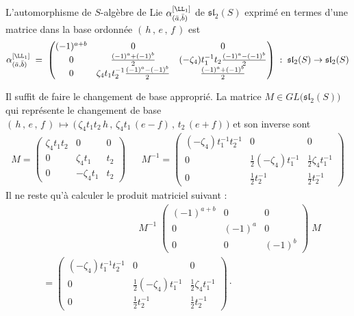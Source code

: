 \begin{annexeCor} L'automorphisme de $S$-algèbre de Lie $\alpha_{(\bar{a},\bar{b})}^{[\LL_1]}$ de $\mathfrak{sl}_2(S)$ exprimé en termes d'une matrice dans la base ordonnée $(\, h \, ,\, e \, ,\, f \,)$ est
$$ \alpha_{(\bar{a},\bar{b})}^{[\LL_1]} \; = \; \begin{pmatrix}
(-1)^{a+b} & 0 & 0 \\ 
0 & \frac{(-1)^{a}+(-1)^{b}}{2} & (-\zeta_4)t_1^{-1}t_2 \frac{(-1)^{a}-(-1)^{b}}{2} \\
0 & \zeta_4t_1t_2^{-1} \frac{(-1)^{a}-(-1)^{b}}{2} & \frac{(-1)^{a}+(-1)^{b}}{2}
\end{pmatrix} \; : \; \mathfrak{sl}_2(S) \rightarrow \mathfrak{sl}_2(S) $$
\begin{pre} Il suffit de faire le changement de base approprié. La matrice $M \in GL\big(\mathfrak{sl}_2(S)\big)$ qui représente le changement de base $(\, h \, ,\, e \, ,\, f \,) \, \mapsto \, \big(\, \zeta_4t_1t_2\,h \, ,\, \zeta_4t_1\,(e - f) \, ,\, t_2\,(e+f) \, \big)$ et son inverse sont
\begin{align*}
M = \begin{pmatrix}
\zeta_4t_1t_2 & 0 & 0 \\ 
0 & \zeta_4t_1 & t_2 \\
0 & -\zeta_4t_1 & t_2
\end{pmatrix} 
&& 
M^{-1} = \begin{pmatrix}
(-\zeta_4)t_1^{-1}t_2^{-1} & 0 & 0 \\ 
0 & \frac{1}{2}(-\zeta_4)t_1^{-1} & \frac{1}{2}\zeta_4 t_1^{-1} \\
0 & \frac{1}{2}t_2^{-1} & \frac{1}{2}t_2^{-1}
\end{pmatrix}
\end{align*}
Il ne reste qu'à calculer le produit matriciel suivant :
\begin{align*} & \qquad \qquad \qquad \qquad \qquad
M^{-1} \; \begin{pmatrix}
(-1)^{a+b} & 0 & 0 \\ 
0 & (-1)^{a} & 0 \\
0 & 0 & (-1)^{b}
\end{pmatrix} \; M \\
&= \begin{pmatrix}
(-\zeta_4)t_1^{-1}t_2^{-1} & 0 & 0 \\ 
0 & \frac{1}{2}(-\zeta_4)t_1^{-1} & \frac{1}{2}\zeta_4 t_1^{-1} \\
0 & \frac{1}{2}t_2^{-1} & \frac{1}{2}t_2^{-1}
\end{pmatrix} \cdot 

\end{align*}
\end{pre}
\end{annexeCor}
